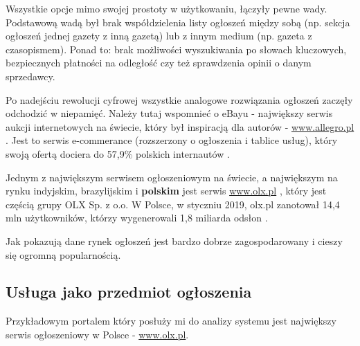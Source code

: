\documentclass[12pt]{article}
\numberwithin{figure}{section}
\begin{document}
Wszystkie opcje mimo swojej prostoty w użytkowaniu, łączyły pewne wady. Podstawową wadą był brak współdzielenia listy ogłoszeń między sobą (np. sekcja ogłoszeń jednej gazety z inną gazetą) lub z innym medium (np. gazeta z czasopismem). Ponad to: brak możliwości wyszukiwania po słowach kluczowych, bezpiecznych płatności na odległość czy też sprawdzenia opinii o danym sprzedawcy.

Po nadejściu rewolucji cyfrowej wszystkie analogowe rozwiązania ogłoszeń zaczęły odchodzić w niepamięć. Należy tutaj wspomnieć o eBayu - największy serwis aukcji internetowych na świecie, który był inspiracją dla autorów - \url{www.allegro.pl} \cite{allegro-wywiad}. Jest to serwis e-commerance (rozszerzony o ogłoszenia i tablice usług), który swoją ofertą dociera do 57,9\% polskich internautów \cite{allegro-liczby}. 

Jednym z największym serwisem ogłoszeniowym na świecie, a największym na rynku indyjskim, brazylijskim i \textbf{polskim} jest serwis \url{www.olx.pl} \cite{olx-wywiad}, który jest częścią grupy OLX Sp. z o.o. W Polsce, w styczniu 2019, olx.pl zanotował 14,4 mln użytkowników, którzy wygenerowali 1,8 miliarda odsłon \cite{olx-liczby}.

Jak pokazują dane rynek ogłoszeń jest bardzo dobrze zagospodarowany i cieszy się ogromną popularnością.
\subsection{Usługa jako przedmiot ogłoszenia}
Przykładowym portalem który posłuży mi do analizy systemu jest największy serwis ogłoszeniowy w Polsce - \url{www.olx.pl}.
\end{document}
